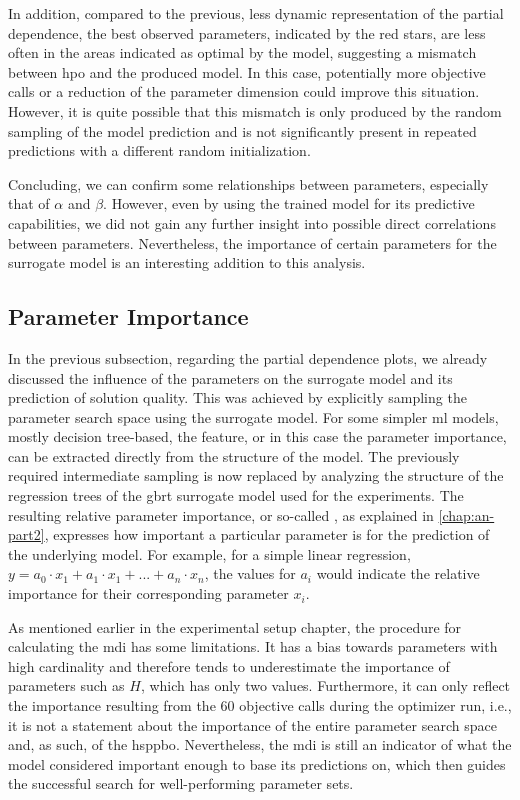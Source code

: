 In addition, compared to the previous, less dynamic representation of the partial dependence, the best observed parameters, indicated by the red stars, are less often in the areas indicated as optimal by the model, suggesting a mismatch between \gls{hpo} and the produced model. In this case, potentially more objective calls or a reduction of the parameter dimension could improve this situation. However, it is quite possible that this mismatch is only produced by the random sampling of the model prediction and is not significantly present in repeated predictions with a different random initialization.

Concluding, we can confirm some relationships between parameters, especially that of $\alpha$ and $\beta$. However, even by using the trained model for its predictive capabilities, we did not gain any further insight into possible direct correlations between parameters. Nevertheless, the importance of certain parameters for the surrogate model is an interesting addition to this analysis.

\subsection{Parameter Importance}

In the previous subsection, regarding the partial dependence plots, we already discussed the influence of the parameters on the surrogate model and its prediction of solution quality. This was achieved by explicitly sampling the parameter search space using the surrogate model. For some simpler \gls{ml} models, mostly decision tree-based, the feature, or in this case the parameter importance, can be  extracted directly from the structure of the model. The previously required intermediate sampling is now replaced by analyzing the structure of the regression trees of the \gls{gbrt} surrogate model used for the experiments. The resulting relative parameter importance, or so-called , as explained in \cref{chap:an-part2}, expresses how important a particular parameter is for the prediction of the underlying model. For example, for a simple linear regression, $y = a_0  \cdot x_1 + a_1 \cdot x_1 + ... + a_n \cdot x_n$, the values for $a_i$ would indicate the relative importance for their corresponding parameter $x_i$. 

As mentioned earlier in the experimental setup chapter, the procedure for calculating the \gls{mdi} has some limitations. It has a bias towards parameters with high cardinality and therefore tends to underestimate the importance of parameters such as $H$, which has only two values. Furthermore, it can only reflect the importance resulting from the 60 objective calls during the optimizer run, i.e., it is not a statement about the importance of the entire parameter search space and, as such, of the \gls{hsppbo}. Nevertheless, the \gls{mdi} is still an indicator of what the model considered important enough to base its predictions on, which then guides the successful search for well-performing parameter sets. 

